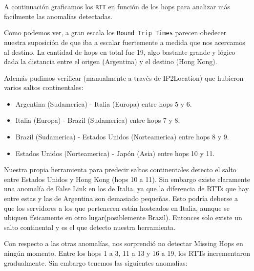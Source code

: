 A continuación graficamos los \texttt{RTT} en función de los hops para analizar más facilmente las anomalías detectadas.

\begin{figure}[H]
    \centering
\end{figure}

Como podemos ver, a gran escala los \texttt{Round Trip Times} parecen obedecer nuestra suposición de que iba a escalar fuertemente a medida que nos acercamos al destino. La cantidad de hops en total fue 19, algo bastante grande y lógico dada la distancia entre el origen (Argentina) y el destino (Hong Kong).

Además pudimos verificar (manualmente a través de IP2Location) que hubieron varios saltos continentales:
\begin{itemize}
\item Argentina (Sudamerica) - Italia (Europa) entre hops 5 y 6.
\item Italia (Europa) - Brazil (Sudamerica) entre hops 7 y 8.
\item Brazil (Sudamerica) - Estados Unidos (Norteamerica) entre hops 8 y 9.
\item Estados Unidos (Norteamerica) - Japón (Asia) entre hops 10 y 11.
\end{itemize}

Nuestra propia herramienta para predecir saltos continentales detecto el salto entre Estados Unidos y Hong Kong (hops 10 a 11). Sin embargo existe claramente
una anomalía de False Link en los de Italia, ya que la diferencia de RTTs que hay entre estas y las de Argentina son demasiado pequeñas. Esto podría deberse
a que los servidores a los que pertenecen están hosteados en Italia, aunque se ubiquen físicamente en otro lugar(posiblemente Brazil). Entonces solo existe
un salto continental y es el que detecto nuestra herramienta.

Con respecto a las otras anomalías, nos sorprendió no detectar Missing Hops en ningún momento. Entre los hops 1 a 3, 11 a 13 y 16 a 19, los RTTs incrementaron gradualmente. Sin embargo tenemos las siguientes anomalías:

